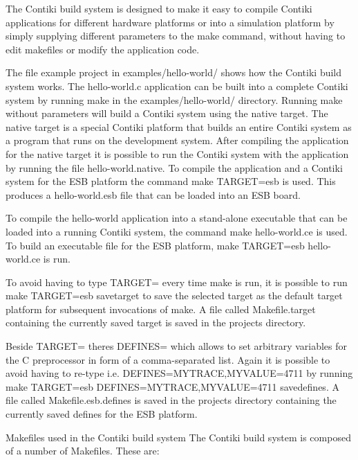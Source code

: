 The Contiki build system is designed to make it easy to compile Contiki applications for different hardware platforms or into a simulation platform by simply supplying different parameters to the make command, without having to edit makefiles or modify the application code.

The file example project in examples/hello-\/world/ shows how the Contiki build system works. The hello-\/world.\+c application can be built into a complete Contiki system by running make in the examples/hello-\/world/ directory. Running make without parameters will build a Contiki system using the native target. The native target is a special Contiki platform that builds an entire Contiki system as a program that runs on the development system. After compiling the application for the native target it is possible to run the Contiki system with the application by running the file hello-\/world.\+native. To compile the application and a Contiki system for the E\+S\+B platform the command make T\+A\+R\+G\+E\+T=esb is used. This produces a hello-\/world.\+esb file that can be loaded into an E\+S\+B board.

To compile the hello-\/world application into a stand-\/alone executable that can be loaded into a running Contiki system, the command make hello-\/world.\+ce is used. To build an executable file for the E\+S\+B platform, make T\+A\+R\+G\+E\+T=esb hello-\/world.\+ce is run.

To avoid having to type T\+A\+R\+G\+E\+T= every time make is run, it is possible to run make T\+A\+R\+G\+E\+T=esb savetarget to save the selected target as the default target platform for subsequent invocations of make. A file called Makefile.\+target containing the currently saved target is saved in the project\textquotesingle{}s directory.

Beside T\+A\+R\+G\+E\+T= there\textquotesingle{}s D\+E\+F\+I\+N\+E\+S= which allows to set arbitrary variables for the C preprocessor in form of a comma-\/separated list. Again it is possible to avoid having to re-\/type i.\+e. D\+E\+F\+I\+N\+E\+S=M\+Y\+T\+R\+A\+C\+E,M\+Y\+V\+A\+L\+U\+E=4711 by running make T\+A\+R\+G\+E\+T=esb D\+E\+F\+I\+N\+E\+S=M\+Y\+T\+R\+A\+C\+E,M\+Y\+V\+A\+L\+U\+E=4711 savedefines. A file called Makefile.\+esb.\+defines is saved in the project\textquotesingle{}s directory containing the currently saved defines for the E\+S\+B platform.

Makefiles used in the Contiki build system The Contiki build system is composed of a number of Makefiles. These are\+:


